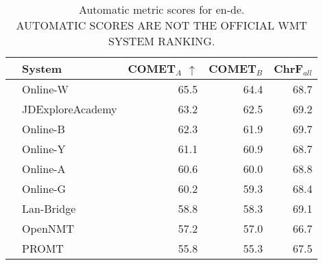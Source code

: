 \begin{table}
\centering
\caption{Automatic metric scores for en-de. \\AUTOMATIC SCORES ARE NOT THE OFFICIAL WMT SYSTEM RANKING.}
\begin{tabular}{llrrr}
\toprule
          &            System &  COMET$_{A}$ $\uparrow$ &  COMET$_{B}$ &  ChrF$_{all}$ \\
\midrule
 \Uncon{} &          Online-W &                    65.5 &         64.4 &          68.7 \\
 \Const{} &  JDExploreAcademy &                    63.2 &         62.5 &          69.2 \\
 \Uncon{} &          Online-B &                    62.3 &         61.9 &          69.7 \\
 \Uncon{} &          Online-Y &                    61.1 &         60.9 &          68.7 \\
 \Uncon{} &          Online-A &                    60.6 &         60.0 &          68.8 \\
 \Uncon{} &          Online-G &                    60.2 &         59.3 &          68.4 \\
 \Uncon{} &        Lan-Bridge &                    58.8 &         58.3 &          69.1 \\
 \Uncon{} &           OpenNMT &                    57.2 &         57.0 &          66.7 \\
 \Uncon{} &             PROMT &                    55.8 &         55.3 &          67.5 \\
\bottomrule
\end{tabular}
\end{table}




